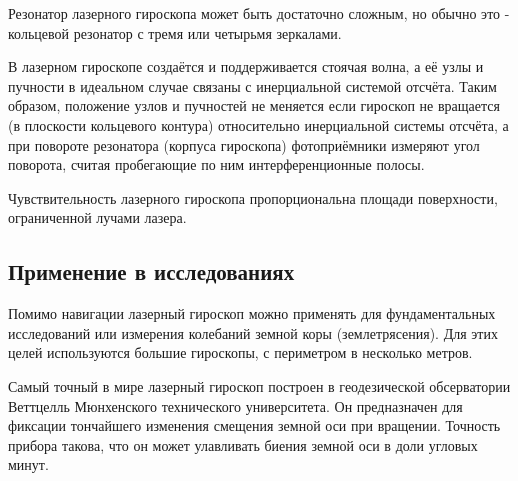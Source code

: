 \documentclass[a4paper, 12pt, openany]{book}
\begin{document}
	Резонатор лазерного гироскопа может быть достаточно сложным, но обычно это - кольцевой резонатор с тремя или четырьмя зеркалами.
	
	В лазерном гироскопе создаётся и поддерживается стоячая волна, а её узлы и пучности в идеальном случае связаны с инерциальной системой отсчёта. Таким образом, положение узлов и пучностей не меняется если гироскоп не вращается (в плоскости кольцевого контура) относительно инерциальной системы отсчёта, а при повороте резонатора (корпуса гироскопа) фотоприёмники измеряют угол поворота, считая пробегающие по ним интерференционные полосы.
	
	Чувствительность лазерного гироскопа пропорциональна площади поверхности, ограниченной лучами лазера.
	
	\subsection{Применение в исследованиях}
	Помимо навигации лазерный гироскоп можно применять для фундаментальных исследований или измерения колебаний земной коры (землетрясения). Для этих целей используются большие гироскопы, с периметром в несколько метров.
	
	Самый точный в мире лазерный гироскоп построен в геодезической обсерватории Веттцелль Мюнхенского технического университета. Он предназначен для фиксации тончайшего изменения смещения земной оси при вращении. Точность прибора такова, что он может улавливать биения земной оси в доли угловых минут.
	
	
	
	
\end{document}

